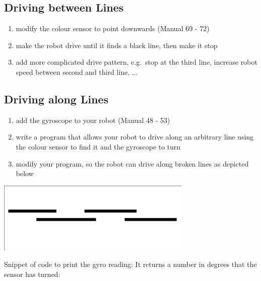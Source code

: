 \documentclass{article}
\begin{document}
  \inputminted{python}{../src/python/colour.py}

  \subsection{Driving between Lines}
  \begin{enumerate}
      \item modify the colour sensor to point downwards (Manual 69 - 72)
      \item make the robot drive until it finds a black line, then make it stop
      \item add more complicated drive pattern, e.g.\ stop at the third line, increase
          robot speed between second and third line, ...
  \end{enumerate}

  \subsection{Driving along Lines}
  \begin{enumerate}
    \item add the gyroscope to your robot (Manual 48 - 53)
    \item write a program that allows your robot to drive along an arbitrary line using 
        the colour sensor to find it and the gyroscope to turn
    \item modify your program, so the robot can drive along broken lines as depicted below
  \end{enumerate}

  \begin{center}
      \includegraphics[width=0.7\textwidth]{broken_line}
  \end{center}
  
  Snippet of code to print the gyro reading: It returns a number in degrees that
  the sensor has turned: \\
  \inputminted{python}{../src/python/gyro.py}
\end{document}
